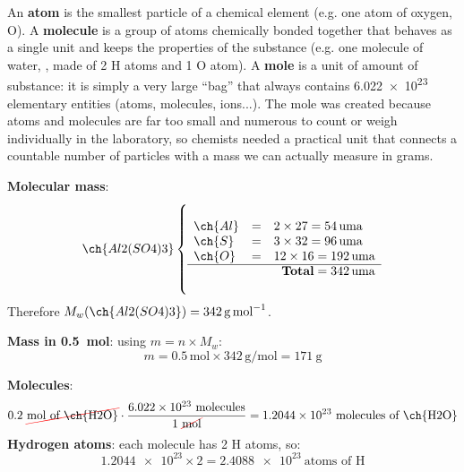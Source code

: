 \documentclass[11pt,a4paper]{article}
\begin{document}
\begin{solucioneng}
An \textbf{atom} is the smallest particle of a chemical element (e.g. one atom of oxygen, O). A \textbf{molecule} is a group of atoms chemically bonded together that behaves as a single unit and keeps the properties of the substance (e.g. one molecule of water, , made of 2 H atoms and 1 O atom). A \textbf{mole} is a unit of amount of substance: it is simply a very large ``bag'' that always contains \num{6.022e23} elementary entities (atoms, molecules, ions...). The mole was created because atoms and molecules are far too small and numerous to count or weigh individually in the laboratory, so chemists needed a practical unit that connects a countable number of particles with a mass we can actually measure in grams.
\end{solucioneng}

\begin{solucioneng}
\textbf{Molecular mass}:
\[
    \ch{Al2(SO4)3} \left\{\rule{0pt}{1.4cm}
        \begin{array}{lcl}
            \ch{Al} &=& 2 \times 27 = 54\,\text{uma} \\
            \ch{S} &=& 3 \times 32 = 96\,\text{uma} \\
            \ch{O} &=& 12 \times 16 = 192\,\text{uma} \\
            \cline{1-3}
            \multicolumn{3}{r}{\textbf{Total} = 342\,\text{uma}}
        \end{array}
    \right.
\]
Therefore $M_w(\ch{Al2(SO4)3}) = \qty{342}{\g\per\mole}$.

\textbf{Mass in \qty{0.5}{\mole}}: using $m = n \times M_w$:
\begin{equation*}
    m = 0.5\,\text{mol} \times 342\,\text{g/mol} = \qty{171}{\g}
\end{equation*}
\end{solucioneng}

\begin{solucioneng}
\textbf{Molecules}:
\begin{equation*}
    0.2\ \cancelred{\unit{\mole}\ \text{of \ch{H2O}}} \cdot \dfrac{\num{6.022e23}\ \text{molecules}}{1\ \cancelred{\unit{\mole}}} = \num{1.2044e23}\ \text{molecules of \ch{H2O}}
\end{equation*}
\textbf{Hydrogen atoms}: each  molecule has 2 H atoms, so:
\begin{equation*}
    \num{1.2044e23} \times 2 = \num{2.4088e23}\ \text{atoms of H}
\end{equation*}
\end{solucioneng}
\end{document}
